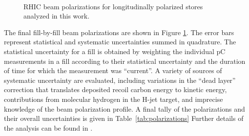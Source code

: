 \begin{figure}
   \\
  \caption{RHIC beam polarizations for longitudinally polarized stores analyzed in this work.}
  \label{fig:beam-polarizations}
\end{figure}

The final fill-by-fill beam polarizations are shown in Figure
\ref{fig:beam-polarizations}. The error bars represent statistical and
systematic uncertainties summed in quadrature. The statistical uncertainty for a
fill is obtained by weighting the individual pC measurements in a fill according
to their statistical uncertainty and the duration of time for which the
measurement was ``current''. A variety of sources of systematic uncertainty are
evaluated, including variations in the ``dead layer'' correction that translates
deposited recoil carbon energy to kinetic energy, contributions from molecular
hydrogen in the H-jet target, and imprecise knowledge of the beam polarization
profile. A final tally of the polarizations and their overall uncertainties is
given in Table~\ref{tab:polarizations} Further details of the analysis can be
found in \cite{CNI05, CNI06}.

